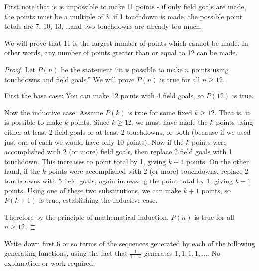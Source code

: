 \documentclass[11pt]{exam}
\def\d{\displaystyle}
\begin{document}
\begin{questions}
\begin{solution}
  First note that is is impossible to make 11 points - if only field goals are made, the points must be a multiple of 3, if 1 touchdown is made, the possible point totals are 7, 10, 13, \ldots and two touchdowns are already too much.
  
  We will prove that 11 is the largest number of points which cannot be made.  In other words, any number of points greater than or equal to 12 can be made.
  
  \begin{proof}
    Let $P(n)$ be the statement ``it is possible to make $n$ points using touchdowns and field goals.''  We will prove $P(n)$ is true for all $n \ge 12$.
    
    First the base case: You can make 12 points with 4 field goals, so $P(12)$ is true.
    
    Now the inductive case: Assume $P(k)$ is true for some fixed $k \ge 12$.  That is, it is possible to make $k$ points.  Since $k \ge 12$, we must have made the $k$ points using either at least 2 field goals or at least 2 touchdowns, or both (because if we used just one of each we would have only 10 points).  Now if the $k$ points were accomplished with 2 (or more) field goals, then replace 2 field goals with 1 touchdown.  This increases to point total by 1, giving $k + 1$ points.  On the other hand, if the $k$ points were accomplished with $2$ (or more) touchdowns, replace 2 touchdowns with 5 field goals, again increasing the point total by 1, giving $k+1$ points.  Using one of these two substitutions, we can make $k+1$ points, so $P(k+1)$ is true, establishing the inductive case.
    
    Therefore by the principle of mathematical induction, $P(n)$ is true for all $n \ge 12$.
  \end{proof}

\end{solution}


\question[4] Write down first 6 or so terms of the sequences generated by each of the following generating functions, using the fact that $\frac{1}{1-x}$ generates $1,1,1,1,\ldots$.  No explanation or work required.
\end{questions}
\end{document}
